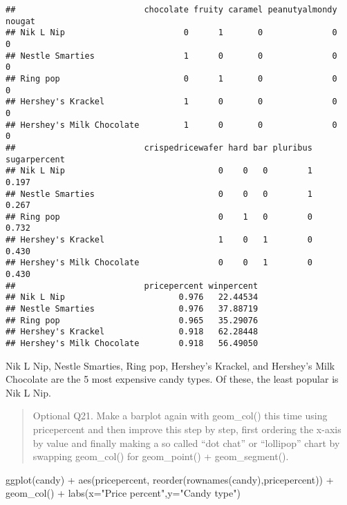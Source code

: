 \documentclass[
]{article}
\newenvironment{Shaded}{\begin{snugshade}}{\end{snugshade}}
\newcommand{\AttributeTok}[1]{\textcolor[rgb]{0.77,0.63,0.00}{#1}}
\newcommand{\FunctionTok}[1]{\textcolor[rgb]{0.00,0.00,0.00}{#1}}
\newcommand{\NormalTok}[1]{#1}
\newcommand{\SpecialCharTok}[1]{\textcolor[rgb]{0.00,0.00,0.00}{#1}}
\newcommand{\StringTok}[1]{\textcolor[rgb]{0.31,0.60,0.02}{#1}}
\begin{document}
\begin{verbatim}
##                          chocolate fruity caramel peanutyalmondy nougat
## Nik L Nip                        0      1       0              0      0
## Nestle Smarties                  1      0       0              0      0
## Ring pop                         0      1       0              0      0
## Hershey's Krackel                1      0       0              0      0
## Hershey's Milk Chocolate         1      0       0              0      0
##                          crispedricewafer hard bar pluribus sugarpercent
## Nik L Nip                               0    0   0        1        0.197
## Nestle Smarties                         0    0   0        1        0.267
## Ring pop                                0    1   0        0        0.732
## Hershey's Krackel                       1    0   1        0        0.430
## Hershey's Milk Chocolate                0    0   1        0        0.430
##                          pricepercent winpercent
## Nik L Nip                       0.976   22.44534
## Nestle Smarties                 0.976   37.88719
## Ring pop                        0.965   35.29076
## Hershey's Krackel               0.918   62.28448
## Hershey's Milk Chocolate        0.918   56.49050
\end{verbatim}

Nik L Nip, Nestle Smarties, Ring pop, Hershey's Krackel, and Hershey's
Milk Chocolate are the 5 most expensive candy types. Of these, the least
popular is Nik L Nip.

\begin{quote}
Optional Q21. Make a barplot again with geom\_col() this time using
pricepercent and then improve this step by step, first ordering the
x-axis by value and finally making a so called ``dot chat'' or
``lollipop'' chart by swapping geom\_col() for geom\_point() +
geom\_segment().
\end{quote}

\begin{Shaded}
\begin{Highlighting}[]
\FunctionTok{ggplot}\NormalTok{(candy) }\SpecialCharTok{+}
  \FunctionTok{aes}\NormalTok{(pricepercent, }\FunctionTok{reorder}\NormalTok{(}\FunctionTok{rownames}\NormalTok{(candy),pricepercent)) }\SpecialCharTok{+}
  \FunctionTok{geom\_col}\NormalTok{() }\SpecialCharTok{+} \FunctionTok{labs}\NormalTok{(}\AttributeTok{x=}\StringTok{"Price percent"}\NormalTok{,}\AttributeTok{y=}\StringTok{"Candy type"}\NormalTok{)}
\end{Highlighting}
\end{Shaded}
\end{document}
